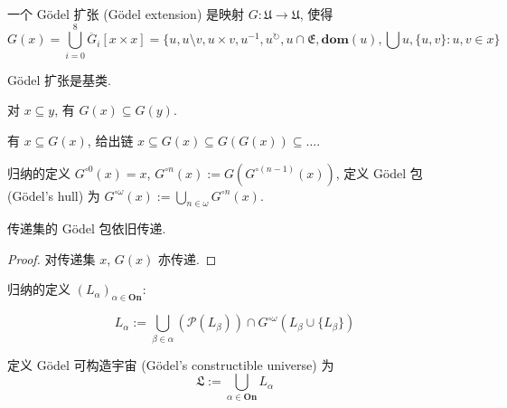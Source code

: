 \begin{definition}[Gödel 扩张]
    一个 Gödel 扩张 (Gödel extension) 是映射 \(G : \mathfrak{U} \to \mathfrak{U}\), 使得
    \[
        G(x) = \bigcup_{i = 0}^8 \ddot{G_i} [x \times x] = \{u,u \setminus v,u \times v, u^{-1}, u^{\circlearrowright}, u \cap \mathfrak{E}, \mathbf{dom}(u), \bigcup{u}, \{u,v\} : u,v \in x\}
    \]
\end{definition}

\begin{lemma}
    Gödel 扩张是基类.
\end{lemma}

\begin{lemma}
    对 \(x \subseteq y\), 有 \(G(x) \subseteq G(y)\).
\end{lemma}

\begin{lemma}
    有 \(x \subseteq G(x)\), 给出链 \(x \subseteq G(x) \subseteq G(G(x)) \subseteq \dots\).

    归纳的定义 \(G^{\circ 0}(x) = x\), \(G^{\circ n} (x) := G(G^{\circ (n-1)}(x))\), 定义 Gödel 包 (Gödel's hull) 为
    \(G^{\circ \omega}(x) := \bigcup_{n \in \omega} G^{\circ n}(x)\).
\end{lemma}

\begin{lemma}
    传递集的 Gödel 包依旧传递.

    \begin{proof}
        对传递集 \(x\), \(G(x)\) 亦传递.
    \end{proof}
\end{lemma}

\begin{definition}
    \label {definition:Gödel's constructible universe}
    归纳的定义 \((L_\alpha)_{\alpha \in \mathbf{On}}\):

    \[
        L_\alpha := \bigcup_{\beta \in \alpha} (\mathcal{P}(L_\beta)) \cap G^{\circ \omega}(L_\beta \cup \{L_\beta\})
    \]

    定义 Gödel 可构造宇宙 (Gödel's constructible universe) 为
    \[
        \mathfrak{L} := \bigcup_{\alpha \in \mathbf{On}} L_\alpha
    \]
\end{definition}

